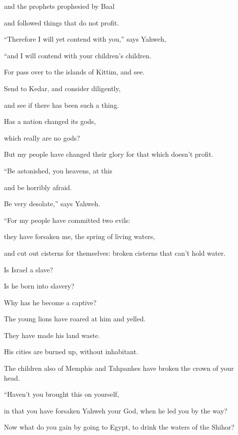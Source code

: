 {\par }{\QB and the prophets prophesied by Baal
\par }{\QB and followed things that do not profit.
\par }{\Q {}“Therefore I will yet contend with you,” says Yahweh,
\par }{\QB “and I will contend with your children’s children.
\par }{\Q {}For pass over to the islands of Kittim, and see.
\par }{\QB Send to Kedar, and consider diligently,
\par }{\QB and see if there has been such a thing.
\par }{\Q {}Has a nation changed its gods,
\par }{\QB which really are no gods?
\par }{\QB But my people have changed their glory for that which doesn’t profit.
\par }{\Q {}“Be astonished, you heavens, at this
\par }{\QB and be horribly afraid.
\par }{\QB Be very desolate,” says Yahweh.
\par }{\Q {}“For my people have committed two evils:
\par }{\QB they have forsaken me, the spring of living waters,
\par }{\QB and cut out cisterns for themselves: broken cisterns that can’t hold water.
\par }{\Q {}Is Israel a slave?
\par }{\QB Is he born into slavery?
\par }{\QB Why has he become a captive?
\par }{\Q {}The young lions have roared at him and yelled.
\par }{\QB They have made his land waste.
\par }{\QB His cities are burned up, without inhabitant.
\par }{\QB {}The children also of Memphis and Tahpanhes have broken the crown of your head.
\par }{\Q {}“Haven’t you brought this on yourself,
\par }{\QB in that you have forsaken Yahweh your God, when he led you by the way?
\par }{\Q {}Now what do you gain by going to Egypt, to drink the waters of the Shihor?
}
